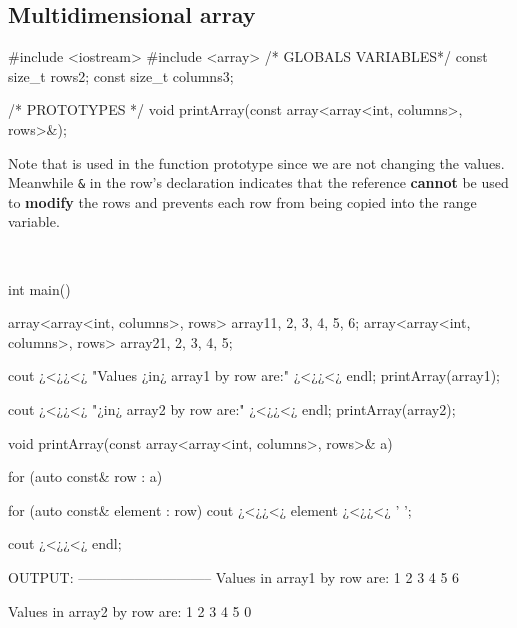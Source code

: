 \subsection{Multidimensional array}
\begin{minipage}{\MPWxSMALLxLISTING\textwidth} %
{} %
\begin{CPPCode}
#include <iostream>
#include <array>
/* GLOBALS VARIABLES*/
const size_t rows{2};
const size_t columns{3};

/* PROTOTYPES */
void printArray(const array<array<int, columns>, rows>&);
\end{CPPCode}
\end{minipage}
\begin{minipage}{\MPWxXXSxLISTING\textwidth} %
Note that  is used in the function prototype since we are not changing the values. Meanwhile \texttt{\&} in the row's declaration indicates that the reference \textbf{cannot} be used to \textbf{modify} the rows and prevents each row from being copied into the range variable.
\end{minipage}
\\
\begin{minipage}{\MPWxSMALLxLISTING\textwidth} %
{} %
\begin{CPPCode}
int main()
{
    array<array<int, columns>, rows> array1{1, 2, 3, 4, 5, 6};
    array<array<int, columns>, rows> array2{1, 2, 3, 4, 5};

    cout ¿<¿¿<¿ "Values ¿in¿ array1 by row are:" ¿<¿¿<¿ endl;
    printArray(array1);

    cout ¿<¿¿<¿ "\nValues ¿in¿ array2 by row are:" ¿<¿¿<¿ endl;
    printArray(array2);
}

void printArray(const array<array<int, columns>, rows>& a)
{
    for (auto const& row : a)
    {
        for (auto const& element : row)
        {
            cout ¿<¿¿<¿ element ¿<¿¿<¿ ' ';            
        }

        cout ¿<¿¿<¿ endl;
    }
}
\end{CPPCode}
\end{minipage}
\begin{minipage}{\MPWxXXSxLISTING\textwidth} %
\vspace{5cm}
\begin{Terminal}
OUTPUT:
-----------------------------
Values in array1 by row are:
1 2 3
4 5 6

Values in array2 by row are:
1 2 3
4 5 0
\end{Terminal}
\end{minipage}\\
